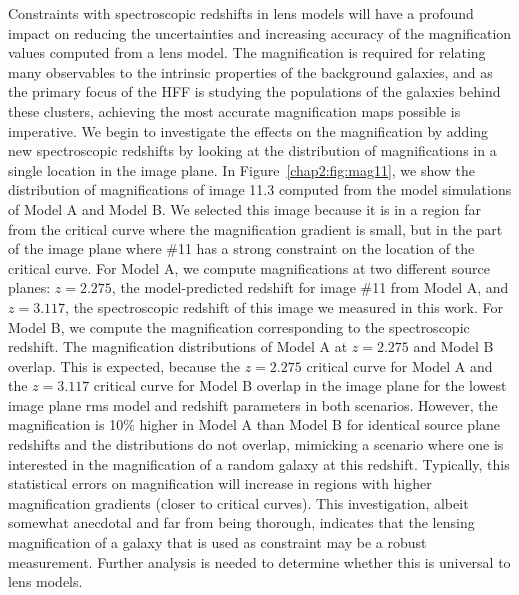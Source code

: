 Constraints with spectroscopic redshifts in lens models will have a profound impact on reducing the uncertainties and increasing accuracy of the magnification values computed from a lens model. The magnification is required for relating many observables to the intrinsic properties of the background galaxies, and as the primary focus of the HFF is studying the populations of the galaxies behind these clusters, achieving the most accurate magnification maps possible is imperative. We begin to investigate the effects on the magnification by adding new spectroscopic redshifts by looking at the distribution of magnifications in a single location in the image plane. In Figure~\ref{chap2:fig:mag11}, we show the distribution of magnifications of image 11.3 computed from the model simulations of Model A and Model B. We selected this image because it is in a region far from the critical curve where the magnification gradient is small, but in the part of the image plane where \#11 has a strong constraint on the location of the critical curve. For Model A, we compute magnifications at two different source planes: $z=2.275$, the model-predicted redshift for image \#11 from Model A, and $z=3.117$, the spectroscopic redshift of this image we measured in this work. For Model B, we compute the magnification corresponding to the spectroscopic redshift. The magnification distributions of Model A at $z=2.275$ and Model B overlap. This is expected, because the $z=2.275$ critical curve for Model A and the $z=3.117$ critical curve for Model B overlap in the image plane for the lowest image plane rms model and redshift parameters in both scenarios. However, the magnification is 10\% higher in Model A than Model B for identical source plane redshifts and the distributions do not overlap, mimicking a scenario where one is interested in the magnification of a random galaxy at this redshift.  Typically, this statistical errors on magnification will increase in regions with higher magnification gradients (closer to critical curves). This investigation, albeit somewhat anecdotal and far from being thorough, indicates that the lensing magnification of a galaxy that is used as constraint may be a robust measurement. Further analysis is needed to determine whether this is universal to lens models.

